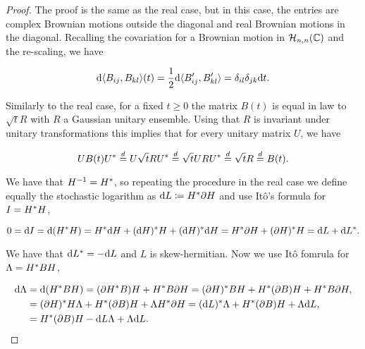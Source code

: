 \begin{proof}
    The proof is the same as the real case, but in this case, the entries are complex Brownian motions outside the diagonal and real Brownian motions in the diagonal. Recalling the covariation for a Brownian motion in $\mathcal H_{n,n}(\mathbb C)$ and the re-scaling, we have

    \begin{equation*}
        \mathrm d\langle B_{ij}, B_{kl}\rangle (t) = \frac12\mathrm d\langle B'_{ij}, B'_{kl}\rangle = \delta_{il}\delta_{jk}\mathrm d t.
    \end{equation*}
    
    
    Similarly to the real case, for a fixed $t\ge 0$ the matrix $B(t)$ is equal in law to $\sqrt tR$ with $R$ a Gaussian unitary ensemble. Using that $R$ is invariant under unitary transformations this implies that for every unitary matrix $U$, we have

    \begin{equation*}
        U B(t) U^* \overset{d}{=} U \sqrt{t} R U^* \overset{d}= \sqrt{t} U R U^* \overset{d}{=} \sqrt{t} R \overset{d}{=} B(t).
    \end{equation*}

    We have that $H^{-1} = H^*$, so repeating the procedure in the real case we define equally the stochastic logarithm as $\mathrm d L \coloneqq H^* \partial H$ and use Itô's formula for $I = H^*H$,

    \begin{equation*}
        0 = \mathrm d I = \mathrm d(H^* H) = H^* \mathrm d H + (\mathrm d H)^* H + (\mathrm d H)^* \mathrm d H = H^* \partial H + (\partial H)^* H = \mathrm d L + \mathrm d L^*.
    \end{equation*}

    We have that $\mathrm d L^* = - \mathrm d L$ and $L$ is skew-hermitian. Now we use Itô fomrula for $\Lambda = H^* B H$,

    \begin{align*}
        \mathrm d \Lambda &= \mathrm d (H^* B H) = (\partial H^* B)H + H^* B\partial H = (\partial H)^* B H + H^* (\partial B) H + H^* B \partial H, \\ 
        &= (\partial H)^* H \Lambda + H^* (\partial B) H + \Lambda H^* \partial H = (\mathrm d L)^* \Lambda + H^* (\partial B) H + \Lambda \mathrm d L, \\ 
        &= H^* (\partial B) H - \mathrm d L \Lambda + \Lambda \mathrm d L. 
    \end{align*}


\end{proof}
